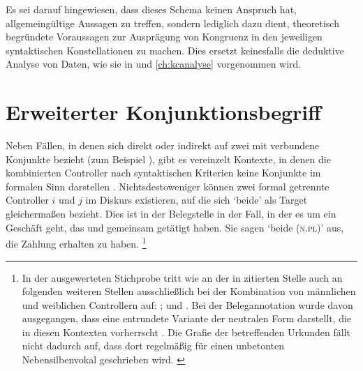 Es sei darauf hingewiesen, dass dieses Schema keinen Anspruch hat,
allgemeingültige Aussagen zu treffen, sondern lediglich dazu dient, theoretisch
begründete Voraussagen zur Ausprägung von Kongruenz in den jeweiligen
syntaktischen Konstellationen zu machen. Dies ersetzt keinesfalls die deduktive
Analyse von Daten, wie sie in  und \ref{ch:kcanalyse}
vorgenommen wird.


\section{Erweiterter Konjunktionsbegriff}
\label{sec:erwkonjbegr}

Neben Fällen, in denen sich  direkt oder indirekt auf zwei mit
 verbundene Konjunkte bezieht (zum Beispiel ), gibt es vereinzelt Kontexte, in denen die
kombinierten Controller nach syntaktischen Kriterien keine Konjunkte im
formalen Sinn darstellen \autocite[vgl.~auch][247--248]{askedal1973}.
Nichtsdestoweniger können zwei formal getrennte Controller $i$ und $j$ im
Diskurs existieren, auf die sich  `beide' als Target
gleichermaßen bezieht. Dies ist in der Belegstelle in 
der Fall, in der es um ein Geschäft geht, das  und 
gemeinsam getätigt haben. Sie sagen  `beide (\textsc{n.pl})' aus, die
Zahlung erhalten zu haben.%
%
	\footnote{In der ausgewerteten Stichprobe tritt  wie an der in
		 zitierten Stelle auch an folgenden weiteren
		Stellen ausschließlich bei der Kombination von männlichen und
		weiblichen Controllern auf:
		\citet[124,23; Nr.~81, Kl.~Tennenbach, Kr.~Emmendingen, 1264]{cao1};
		\citet[205,38--39; Nr.~190, Basel, 1273]{cao1} und
		\citet[175,14; Nr.~N~230, Straßburg, 1283]{cao5}.
		Bei der Belegannotation wurde davon ausgegangen, dass 
		eine entrundete Variante der neutralen Form  darstellt,
		die in diesen Kontexten vorherrscht \autocites(siehe auch
		Anhang~\ref{sec:caoalemschwa})[vgl.][41]{paul2007}. Die Grafie der
		betreffenden Urkunden fällt nicht dadurch auf, dass dort regelmäßig
		 für einen unbetonten Nebensilbenvokal geschrieben wird.
		\label{fn:caoalemschwa}}

